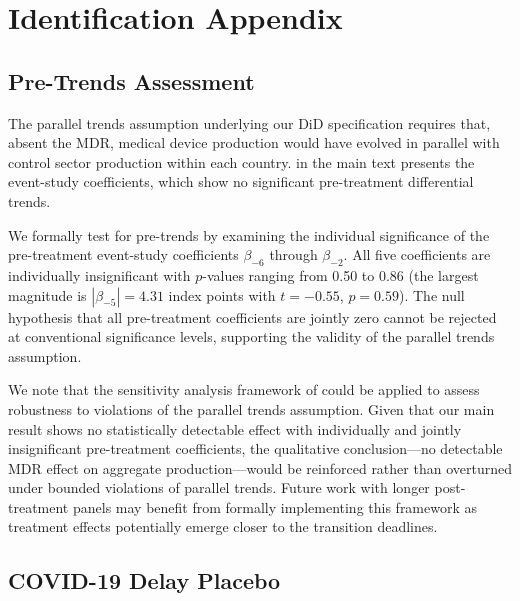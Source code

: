 \documentclass[12pt]{article}
\begin{document}

\section{Identification Appendix}
\label{app:identification}

\subsection{Pre-Trends Assessment}

The parallel trends assumption underlying our DiD specification requires that, absent the MDR, medical device production would have evolved in parallel with control sector production within each country.  in the main text presents the event-study coefficients, which show no significant pre-treatment differential trends.

We formally test for pre-trends by examining the individual significance of the pre-treatment event-study coefficients $\beta_{-6}$ through $\beta_{-2}$. All five coefficients are individually insignificant with $p$-values ranging from 0.50 to 0.86 (the largest magnitude is $|\beta_{-5}| = 4.31$ index points with $t = -0.55$, $p = 0.59$). The null hypothesis that all pre-treatment coefficients are jointly zero cannot be rejected at conventional significance levels, supporting the validity of the parallel trends assumption.

We note that the sensitivity analysis framework of \citet{rambachan2023more} could be applied to assess robustness to violations of the parallel trends assumption. Given that our main result shows no statistically detectable effect with individually and jointly insignificant pre-treatment coefficients, the qualitative conclusion---no detectable MDR effect on aggregate production---would be reinforced rather than overturned under bounded violations of parallel trends. Future work with longer post-treatment panels may benefit from formally implementing this framework as treatment effects potentially emerge closer to the transition deadlines.

\subsection{COVID-19 Delay Placebo}
\end{document}
